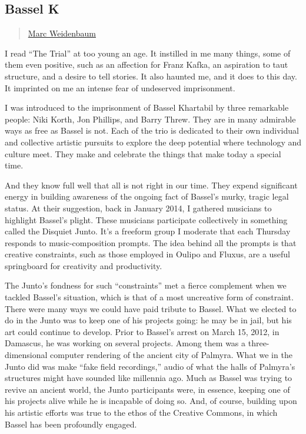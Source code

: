 \subsection{Bassel K}\label{bassel-k}

\begin{quote}
\href{../appendix/attributions.html\#marc-weidenbaum}{Marc Weidenbaum}
\end{quote}

I read ``The Trial'' at too young an age. It instilled in me many
things, some of them even positive, such as an affection for Franz
Kafka, an aspiration to taut structure, and a desire to tell stories. It
also haunted me, and it does to this day. It imprinted on me an intense
fear of undeserved imprisonment.

I was introduced to the imprisonment of Bassel Khartabil by three
remarkable people: Niki Korth, Jon Phillips, and Barry Threw. They are
in many admirable ways as free as Bassel is not. Each of the trio is
dedicated to their own individual and collective artistic pursuits to
explore the deep potential where technology and culture meet. They make
and celebrate the things that make today a special time.

And they know full well that all is not right in our time. They expend
significant energy in building awareness of the ongoing fact of Bassel's
murky, tragic legal status. At their suggestion, back in January 2014, I
gathered musicians to highlight Bassel's plight. These musicians
participate collectively in something called the Disquiet Junto. It's a
freeform group I moderate that each Thursday responds to
music-composition prompts. The idea behind all the prompts is that
creative constraints, such as those employed in Oulipo and Fluxus, are a
useful springboard for creativity and productivity.

The Junto's fondness for such ``constraints'' met a fierce complement
when we tackled Bassel's situation, which is that of a most uncreative
form of constraint. There were many ways we could have paid tribute to
Bassel. What we elected to do in the Junto was to keep one of his
projects going: he may be in jail, but his art could continue to
develop. Prior to Bassel's arrest on March 15, 2012, in Damascus, he was
working on several projects. Among them was a three-dimensional computer
rendering of the ancient city of Palmyra. What we in the Junto did was
make ``fake field recordings,'' audio of what the halls of Palmyra's
structures might have sounded like millennia ago. Much as Bassel was
trying to revive an ancient world, the Junto participants were, in
essence, keeping one of his projects alive while he is incapable of
doing so. And, of course, building upon his artistic efforts was true to
the ethos of the Creative Commons, in which Bassel has been profoundly
engaged.

